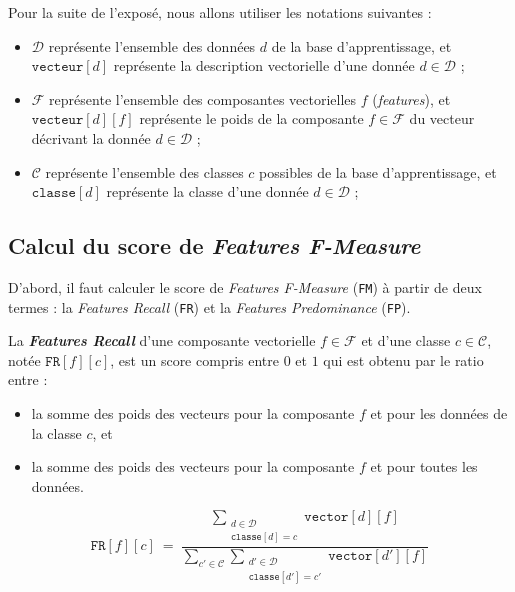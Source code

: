 	Pour la suite de l'exposé, nous allons utiliser les notations suivantes :
	\begin{itemize}
		\item $\mathcal{D}$ représente l'ensemble des données $d$ de la base d'apprentissage,
		et $\texttt{vecteur}[d]$ représente la description vectorielle d'une donnée $d \in \mathcal{D}$ ;
		\item $\mathcal{F}$ représente l'ensemble des composantes vectorielles $f$ (\textit{features}),
		et $\texttt{vecteur}[d][f]$ représente le poids de la composante $f \in \mathcal{F}$ du vecteur décrivant la donnée $d \in \mathcal{D}$ ;
		\item $\mathcal{C}$ représente l'ensemble des classes $c$ possibles de la base d'apprentissage,
		et $\texttt{classe}[d]$ représente la classe d'une donnée $d \in \mathcal{D}$ ;
	\end{itemize}
	
	
	\subsection{Calcul du score de \textit{Features F-Measure}}
	\label{annex:C.3.1-DESCRIPTION-IMPLEMENTATION-FEATURES-MAXIMIZATION-METRIC-CALCUL-FMEASURE}
	
		D'abord, il faut calculer le score de \textit{Features F-Measure} (\texttt{FM}) à partir de deux termes : la \textit{Features Recall} (\texttt{FR}) et la \textit{Features Predominance} (\texttt{FP}).
		\newline
		
		
		
		La \textbf{\textit{Features Recall}} d'une composante vectorielle $f \in \mathcal{F}$ et d'une classe $c \in \mathcal{C}$, notée $\texttt{FR}[f][c]$, est un score compris entre $0$ et $1$ qui est obtenu par le ratio entre :
		\begin{itemize}
			\item la somme des poids des vecteurs pour la composante $f$ et pour les données de la classe $c$, et
			\item la somme des poids des vecteurs pour la composante $f$ et pour toutes les données.
		\end{itemize}
		
		\begin{equation}
			\label{equation:C.3.1-DESCRIPTION-IMPLEMENTATION-FEATURES-MAXIMIZATION-METRIC-FEATURES-RECALL}
			\texttt{FR}[f][c]~=~\frac{
				\sum\limits_{
					\substack{
						d \in \mathcal{D} \\
						\texttt{classe}[d]=c
					}
				} \texttt{vector}[d][f]
			}{
				\sum\limits_{
					c' \in \mathcal{C}
				}
				\sum\limits_{
					\substack{
						d' \in \mathcal{D} \\
						\texttt{classe}[d']=c'
					}
				} \texttt{vector}[d'][f]
			}
		\end{equation}
		
